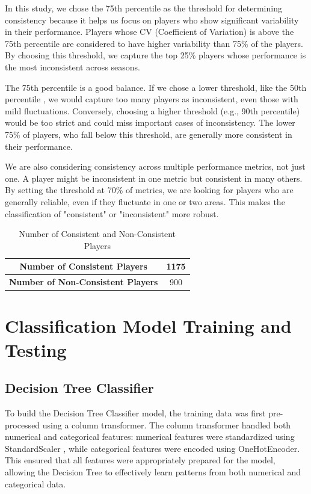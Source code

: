 \documentclass[12pt, a4paper,oneside]{book}
\numberwithin{equation}{section}
\begin{document}
In this study, we chose the 75th percentile as the threshold for determining consistency because it helps us focus on players who show significant variability in their performance. Players whose CV (Coefficient of Variation) is above the 75th percentile are considered to have higher variability than 75\% of the players. By choosing this threshold, we capture the top 25\% players whose performance is the most inconsistent across seasons.

The 75th percentile is a good balance. If we chose a lower threshold, like the 50th percentile \cite{sarmento2018}, we would capture too many players as inconsistent, even those with mild fluctuations. Conversely, choosing a higher threshold (e.g., 90th percentile) would be too strict and could miss important cases of inconsistency. The lower 75\% of players, who fall below this threshold, are generally more consistent in their performance.

We are also considering consistency across multiple performance metrics, not just one. A player might be inconsistent in one metric but consistent in many others. By setting the threshold at 70\% of metrics, we are looking for players who are generally reliable, even if they fluctuate in one or two areas. This makes the classification of "consistent" or "inconsistent" more robust.

\begin{table}[ht]
    \centering
    \caption{Number of Consistent and Non-Consistent Players}
    \begin{tabular}{|c|c|}
        \hline
        \textbf{Number of Consistent Players} & 1175  \\ \hline
        \textbf{Number of Non-Consistent Players} & 900  \\ \hline
    \end{tabular}
\end{table}

\section{Classification Model Training and Testing}\label{sec:4.4}

\subsection{Decision Tree Classifier}\label{sec:4.4.1}

To build the Decision Tree Classifier model, the training data was first pre-processed using a column transformer. The column transformer handled both numerical and categorical
features: numerical features were standardized using StandardScaler \cite{james2013} \cite{Kaggle2021}, while categorical features were encoded using OneHotEncoder. This ensured that all features were appropriately prepared for the model, allowing the Decision Tree to effectively learn patterns from both numerical and categorical data.
\end{document}
